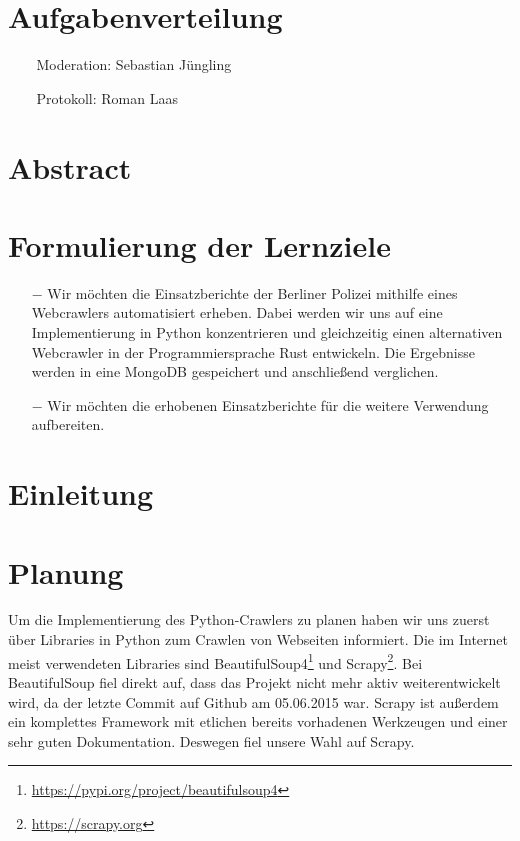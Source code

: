 \documentclass[chapterprefix=false, 12pt, a4paper, oneside, parskip=half, listof=totoc, bibliography=totoc, numbers=noendperiod]{scrbook}
\begin{document}
    \tableofcontents

    \chapter{Aufgabenverteilung}
\begin{itemize}
	\item[$$] Moderation: Sebastian Jüngling
	\item[$$] Protokoll: Roman Laas
\end{itemize}

    \chapter{Abstract}

    \chapter{Formulierung der Lernziele}

\begin{itemize}
\item[$-$] Wir möchten die Einsatzberichte der Berliner Polizei mithilfe eines Webcrawlers automatisiert erheben. Dabei werden wir uns auf eine Implementierung in Python konzentrieren und gleichzeitig einen alternativen Webcrawler in der Programmiersprache Rust entwickeln. Die Ergebnisse werden in eine MongoDB gespeichert und anschließend verglichen.
\item[$-$] Wir möchten die erhobenen Einsatzberichte für die weitere Verwendung aufbereiten.
\end{itemize}

	\chapter{Einleitung}

    \chapter{Planung}

    Um die Implementierung des Python-Crawlers zu planen haben wir uns zuerst über Libraries in Python zum Crawlen von Webseiten
    informiert. Die im Internet meist verwendeten Libraries sind BeautifulSoup4\footnote{\url{https://pypi.org/project/beautifulsoup4}}
    und Scrapy\footnote{\url{https://scrapy.org}}. Bei BeautifulSoup fiel direkt auf, dass das Projekt nicht mehr aktiv weiterentwickelt wird,
    da der letzte Commit auf Github am 05.06.2015 war. Scrapy ist außerdem ein komplettes Framework mit etlichen bereits vorhadenen
    Werkzeugen und einer sehr guten Dokumentation. Deswegen fiel unsere Wahl auf Scrapy.
\end{document}
